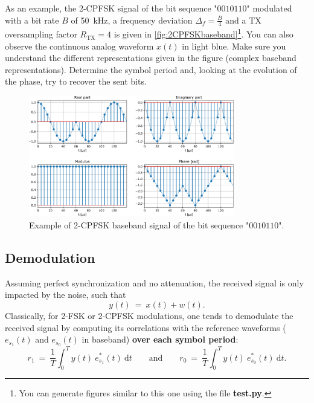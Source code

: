 As an example, the 2-CPFSK signal of the bit sequence "$0010110$" modulated with a bit rate $B$ of \SI{50}{\kilo\hertz}, a frequency deviation $\Delta_f=\frac{B}{4}$ and a TX oversampling factor $R_{\text{TX}}=4$ is given in \autoref{fig:2CPFSKbaseband}\footnote{You can generate figures similar to this one using the file \textbf{test.py}.}. You can also observe the continuous analog waveform $x(t)$ in light blue. Make sure you understand the different representations given in the figure (complex baseband representations). Determine the symbol period and, looking at the evolution of the phase, try to recover the sent bits.

\begin{figure}[h]
    \centering
    \includegraphics[width=0.8\textwidth]{figures/2-cpfsk-bis.pdf}
    \caption{Example of 2-CPFSK baseband signal of the bit sequence "$0010110$".}
    \label{fig:2CPFSKbaseband}
\end{figure}


\subsection{Demodulation}
Assuming perfect synchronization and no attenuation, the received signal is only impacted by the noise, such that
\begin{equation*}
    y(t)\:=\:x(t) + w(t).
\end{equation*}
Classically, for 2-FSK or 2-CPFSK modulations, one tends to demodulate the received signal by computing its correlations with the reference waveforms ($e_{s_1}(t)$ and $e_{s_0}(t)$ in baseband) \textbf{over each symbol period}:
\begin{equation*}
    r_1\:=\:\frac{1}{T}\int_0^T y(t)\:e_{s_1}^*(t) \:\text{d}t\qquad \text{and} \qquad r_0\:=\:\frac{1}{T}\int_0^T y(t)\:e_{s_0}^*(t) \:\text{d}t.
\end{equation*}

